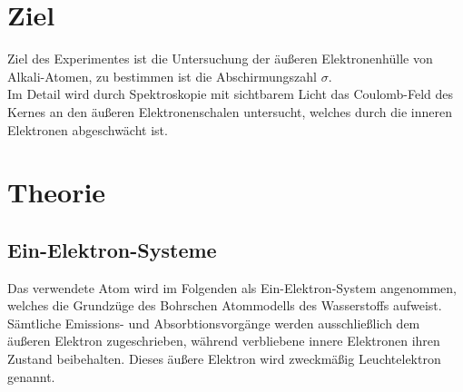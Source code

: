 \section*{Ziel}
Ziel des Experimentes ist die Untersuchung der äußeren Elektronenhülle von Alkali-Atomen, zu bestimmen ist die Abschirmungszahl $\sigma$.\\
Im Detail wird durch Spektroskopie mit sichtbarem Licht das Coulomb-Feld des Kernes an den äußeren Elektronenschalen untersucht,
welches durch die inneren Elektronen abgeschwächt ist.

\section{Theorie}
\label{sec:Theorie}
\subsection{Ein-Elektron-Systeme} %
\label{sub:1e}
Das verwendete Atom wird im Folgenden als Ein-Elektron-System angenommen, welches die Grundzüge des Bohrschen Atommodells des Wasserstoffs aufweist.
Sämtliche Emissions- und Absorbtionsvorgänge werden ausschließlich dem äußeren Elektron zugeschrieben, während verbliebene innere Elektronen ihren Zustand beibehalten.
Dieses äußere Elektron wird zweckmäßig Leuchtelektron genannt.

